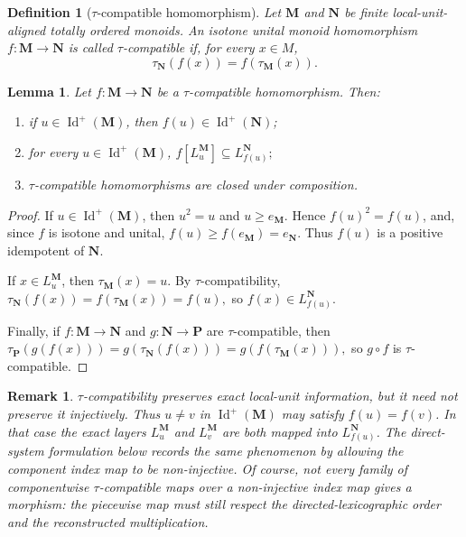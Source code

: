 \documentclass[pdflatex,sn-mathphys-num]{sn-jnl}
\theoremstyle{thmstyleone}%
\newtheorem{lemma}[theorem]{Lemma}
\theoremstyle{thmstyletwo}%
\newtheorem{remark}[theorem]{Remark}
\theoremstyle{thmstylethree}%
\newtheorem{definition}[theorem]{Definition}
\newcommand{\PosId}{\operatorname{Id}^{+}}
\newcommand{\layer}[1]{L_{#1}}
\begin{document}
\begin{definition}[\(\tau\)-compatible homomorphism]
\label{def:taucomp-homomorphism}
Let \(\mathbf M\) and \(\mathbf N\) be finite local-unit-aligned totally ordered monoids.
An isotone unital monoid homomorphism \(f\colon \mathbf M\to \mathbf N \) is called \emph{\(\tau\)-compatible} if, for every \(x\in M\),
\[
\tau_{\mathbf N}(f(x))=f(\tau_{\mathbf M}(x)).
\]
\end{definition}

\begin{lemma}\label{lem:taucomp-layer-preservation}
Let \(f\colon \mathbf M\to \mathbf N\) be a \(\tau\)-compatible homomorphism.
Then:
\begin{enumerate}
\item\label{item:positiveLESZ} if \(u\in\PosId(\mathbf M)\), then \(f(u)\in\PosId(\mathbf N)\);
\item for every \(u\in\PosId(\mathbf M)\), \(f[\layer{u}^{\mathbf M}]\subseteq \layer{f(u)}^{\mathbf N}; \)
\item \(\tau\)-compatible homomorphisms are closed under composition.
\end{enumerate}
\end{lemma}

\begin{proof}
If \(u\in\PosId(\mathbf M)\), then \(u^2=u\) and \(u\ge e_{\mathbf M}\).
Hence \(f(u)^2=f(u)\), and, since \(f\) is isotone and unital, \(f(u)\ge f(e_{\mathbf M})=e_{\mathbf N}\).
Thus \(f(u)\) is a positive idempotent of \(\mathbf N\).

If \(x\in \layer{u}^{\mathbf M}\), then \(\tau_{\mathbf M}(x)=u\).
By \(\tau\)-compatibility, \(\tau_{\mathbf N}(f(x))=f(\tau_{\mathbf M}(x))=f(u),\) so \(f(x)\in \layer{f(u)}^{\mathbf N}\).

Finally, if \(f\colon\mathbf M\to\mathbf N\) and \(g\colon\mathbf N\to\mathbf P\) are \(\tau\)-compatible, then \(\tau_{\mathbf P}(g(f(x)))=g(\tau_{\mathbf N}(f(x))) =g(f(\tau_{\mathbf M}(x))),\) so \(g\circ f\) is \(\tau\)-compatible.
\end{proof}

\begin{remark}\label{rem:taucomp-idempotent-collapse}
\(\tau\)-compatibility preserves exact local-unit information, but it need not preserve it injectively.
Thus \(u\neq v\) in \(\PosId(\mathbf M)\) may satisfy \(f(u)=f(v)\).
In that case the exact layers \(\layer{u}^{\mathbf M}\) and \(\layer{v}^{\mathbf M}\) are both mapped into \(\layer{f(u)}^{\mathbf N}\).
The direct-system formulation below records the same phenomenon by allowing the component index map to be non-injective.
Of course, not every family of componentwise $\tau$-compatible maps over a non-injective index map gives a morphism: the piecewise map must still respect the directed-lexicographic order and the reconstructed multiplication.
\end{remark}
\end{document}
